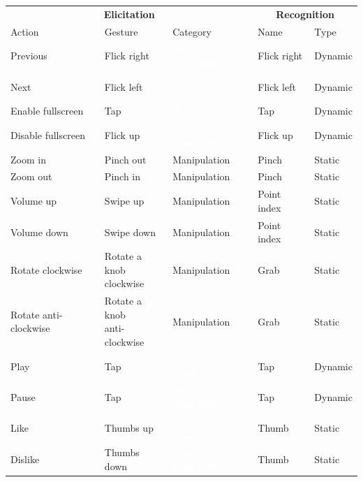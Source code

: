 \begin{table}[bt]
    \centering
    \footnotesize
    \renewcommand{\arraystretch}{1.1}
    \begin{tabular}{lll|ll}%
    	\toprule
    	\multicolumn{3}{c|}{\textbf{Elicitation}} & \multicolumn{2}{c}{\textbf{Recognition}}\\
    	Action & Gesture & Category & Name & Type \\
    	\midrule
        Previous & Flick right & \cellcolor{semaphoric} \textcolor{white}{Stroke semaphoric} & Flick right & Dynamic \\
        Next & Flick left & \cellcolor{semaphoric} \textcolor{white}{Stroke semaphoric} & Flick left & Dynamic \\
        Enable fullscreen & Tap & \cellcolor{pointing} \textcolor{white}{Pointing} & Tap & Dynamic \\
        Disable fullscreen & Flick up & \cellcolor{semaphoric} \textcolor{white}{Stroke semaphoric} & Flick up & Dynamic \\
        Zoom in & Pinch out & \cellcolor{manipulation} Manipulation & Pinch & Static \\
        Zoom out & Pinch in & \cellcolor{manipulation} Manipulation & Pinch & Static \\
        Volume up & Swipe up & \cellcolor{manipulation} Manipulation & Point index & Static \\
        Volume down & Swipe down & \cellcolor{manipulation} Manipulation & Point index & Static \\
        Rotate clockwise &\shortstack[l]{Rotate a knob\\clockwise} & \cellcolor{manipulation} Manipulation & Grab & Static \\
        Rotate anti-clockwise &\shortstack[l]{Rotate a knob\\anti-clockwise} & \cellcolor{manipulation} Manipulation & Grab & Static \\
        Play & Tap & \cellcolor{semaphoric} \textcolor{white}{Stroke semaphoric} & Tap & Dynamic \\
        Pause & Tap & \cellcolor{semaphoric} \textcolor{white}{Stroke semaphoric} & Tap & Dynamic \\
        Like & Thumbs up & \cellcolor{semaphoric} \textcolor{white}{Static semaphoric} & Thumb & Static \\
        Dislike & Thumbs down & \cellcolor{semaphoric} \textcolor{white}{Static semaphoric} & Thumb & Static \\

\end{tabular}
\end{table}
